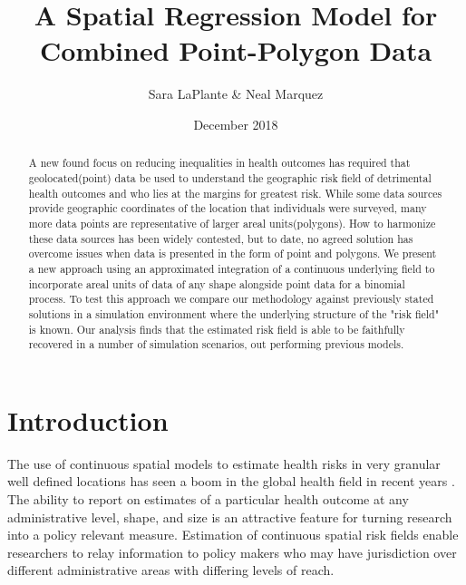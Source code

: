 \documentclass{article}
\begin{document}
\title{A Spatial Regression Model for Combined Point-Polygon Data}
\author{Sara LaPlante \& Neal Marquez}
\date{December 2018}

\maketitle

\begin{abstract}
A new found focus on reducing inequalities in health outcomes has required that geolocated(point) data be used to understand the geographic risk field of detrimental health outcomes and who lies at the margins for greatest risk. While some data sources provide geographic coordinates of the location that individuals were surveyed, many more data points are representative of larger areal units(polygons). How to harmonize these data sources has been widely contested, but to date, no agreed solution has overcome issues when data is presented in the form of point and polygons. We present a new approach using an approximated integration of a continuous underlying field to incorporate areal units of data of any shape alongside point data for a binomial process.  To test this approach we compare our methodology against previously stated solutions in a simulation environment where the underlying structure of the "risk field" is known. Our analysis finds that the estimated risk field is able to be faithfully recovered in a number of simulation scenarios, out performing previous models. 
\end{abstract}

\section{Introduction}\label{introduction}

The use of continuous spatial models to estimate health risks in very granular well defined locations has seen a boom in the global health field in recent years \cite{Bosco2017, Burke2016, Gething2015, Golding2017, Utazi2018a, Wakefield2017}. The ability to report on estimates of a particular health outcome at any administrative level, shape, and size is an attractive feature for turning research into a policy relevant measure. Estimation of continuous spatial risk fields enable researchers to relay information to policy makers who may have jurisdiction over different administrative areas with differing levels of reach. 
\end{document}
